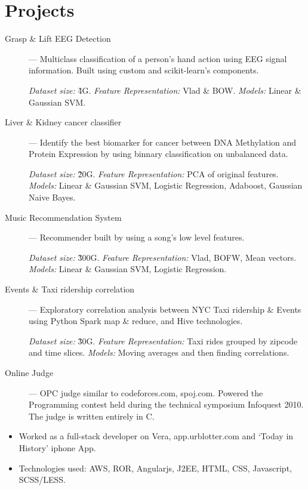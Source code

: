 \documentclass{resume}
\begin{document}
\section{Projects}
  \begin{description}
    \item[Grasp \& Lift EEG Detection] --- Multiclass classification of a person's hand action using EEG signal information.  Built using custom and scikit-learn's components.
      \par \textit{Dataset size:} \~4G.  \textit{Feature Representation:} Vlad \& BOW\@.  \textit{Models:} Linear \& Gaussian SVM\@.
    \item[Liver \& Kidney cancer classifier] --- Identify the best biomarker for cancer between DNA Methylation and Protein Expression by using binnary classification on unbalanced data.
      \par \textit{Dataset size:} \~20G.  \textit{Feature Representation:} PCA of original features.  \textit{Models:} Linear \& Gaussian SVM\@, Logistic Regression, Adaboost, Gaussian Naive Bayes.
    \item[Music Recommendation System] --- Recommender built by using a song's low level features.
      \par \textit{Dataset size:} \~300G.  \textit{Feature Representation:} Vlad, BOFW, Mean vectors.  \textit{Models:} Linear \& Gaussian SVM, Logistic Regression.
    \item[Events \& Taxi ridership correlation] --- Exploratory correlation analysis between NYC Taxi ridership \& Events using Python Spark map \& reduce, and Hive technologies.
      \par \textit{Dataset size:} \~30G. \textit{Feature Representation:} Taxi rides grouped by zipcode and time slices.  \textit{Models:} Moving averages and then finding correlations.
    \item[Online Judge] --- OPC judge similar to codeforces.com, spoj.com.  Powered the Programming contest held during the technical symposium Infoquest 2010.  The judge is written entirely in C.
  \end{description}


\begin{itemize} \itemsep1pt \parskip0pt
  \item Worked as a full-stack developer on Vera, app.urblotter.com and `Today in History' iphone App.
  \item Technologies used: AWS, ROR, Angularjs, J2EE, HTML, CSS, Javascript, SCSS/LESS\@.
\end{itemize}
\end{document}
